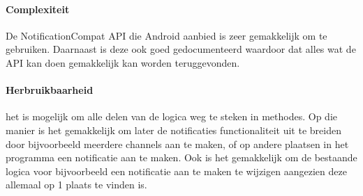 \paragraph{Complexiteit}
De NotificationCompat API die Android aanbied is zeer gemakkelijk om te gebruiken. 
Daarnaast is deze ook goed gedocumenteerd waardoor dat alles wat de API kan doen 
gemakkelijk kan worden teruggevonden.  

\paragraph{Herbruikbaarheid}
het is mogelijk om alle delen van de logica weg te steken in methodes. Op die manier 
is het gemakkelijk om later de notificaties functionaliteit uit te breiden door bijvoorbeeld meerdere channels aan te maken, 
of op andere plaatsen in het programma een notificatie aan te maken. Ook is het gemakkelijk om de bestaande logica voor 
bijvoorbeeld een notificatie aan te maken te wijzigen aangezien deze allemaal op 1 plaats te vinden is.